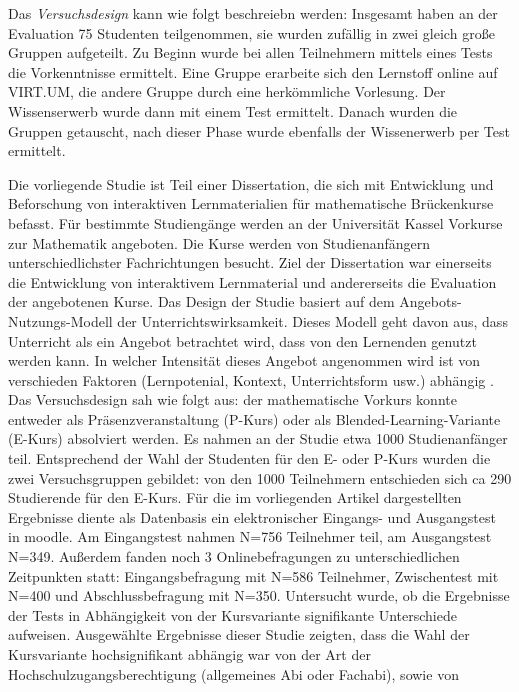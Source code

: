 Das \emph{Versuchsdesign} kann wie folgt beschreiebn werden: Insgesamt
haben an der Evaluation 75 Studenten teilgenommen, sie wurden zufällig
in zwei gleich große Gruppen aufgeteilt. Zu Beginn wurde bei allen
Teilnehmern mittels eines Tests die Vorkenntnisse ermittelt. Eine Gruppe
erarbeite sich den Lernstoff online auf VIRT.UM, die andere Gruppe durch
eine herkömmliche Vorlesung. Der Wissenserwerb wurde dann mit einem Test
ermittelt. Danach wurden die Gruppen getauscht, nach dieser Phase wurde
ebenfalls der Wissenerwerb per Test ermittelt.

\textbf{}

Die vorliegende Studie ist Teil einer Dissertation, die sich mit
Entwicklung und Beforschung von interaktiven Lernmaterialien für
mathematische Brückenkurse befasst. Für bestimmte Studiengänge werden an
der Universität Kassel Vorkurse zur Mathematik angeboten. Die Kurse
werden von Studienanfängern unterschiedlichster Fachrichtungen besucht.
Ziel der Dissertation war einerseits die Entwicklung von interaktivem
Lernmaterial und andererseits die Evaluation der angebotenen Kurse. Das
Design der Studie basiert auf dem Angebots-Nutzungs-Modell der
Unterrichtswirksamkeit. Dieses Modell geht davon aus, dass Unterricht
als ein Angebot betrachtet wird, dass von den Lernenden genutzt werden
kann. In welcher Intensität dieses Angebot angenommen wird ist von
verschieden Faktoren (Lernpotenial, Kontext, Unterrichtsform usw.)
abhängig \parencite{Helmke2008}. Das Versuchsdesign sah wie folgt aus:
der mathematische Vorkurs konnte entweder als Präsenzveranstaltung
(P-Kurs) oder als Blended-Learning-Variante (E-Kurs) absolviert werden.
Es nahmen an der Studie etwa 1000 Studienanfänger teil. Entsprechend der
Wahl der Studenten für den E- oder P-Kurs wurden die zwei
Versuchsgruppen gebildet: von den 1000 Teilnehmern entschieden sich ca
290 Studierende für den E-Kurs. Für die im vorliegenden Artikel
dargestellten Ergebnisse diente als Datenbasis ein elektronischer
Eingangs- und Ausgangstest in moodle. Am Eingangstest nahmen N=756
Teilnehmer teil, am Ausgangstest N=349. Außerdem fanden noch 3
Onlinebefragungen zu unterschiedlichen Zeitpunkten statt:
Eingangsbefragung mit N=586 Teilnehmer, Zwischentest mit N=400 und
Abschlussbefragung mit N=350. Untersucht wurde, ob die Ergebnisse der
Tests in Abhängigkeit von der Kursvariante signifikante Unterschiede
aufweisen. Ausgewählte Ergebnisse dieser Studie zeigten, dass die Wahl
der Kursvariante hochsignifikant abhängig war von der Art der
Hochschulzugangsberechtigung (allgemeines Abi oder Fachabi), sowie von
